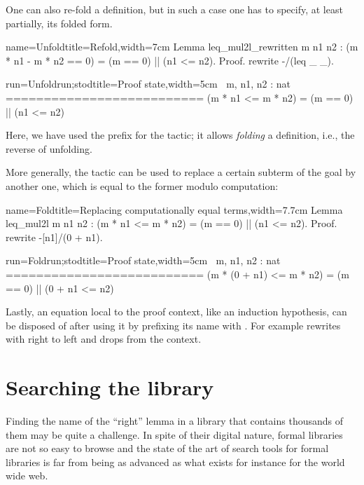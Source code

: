 One can also re-fold a definition, but in such a case one has to specify,
at least partially, its folded form.

\begin{coq-left}{name=Unfold}{title=Refold,width=7cm}
Lemma leq_mul2l_rewritten m n1 n2 :
  (m * n1 - m * n2 == 0) =
    (m == 0) || (n1 <= n2).
Proof.
rewrite -/(leq _ _).
\end{coq-left}
\begin{coqout-right}{run=Unfoldrun;stod}{title=Proof state,width=5cm}
$~$
m, n1, n2 : nat
==========================
(m * n1 <= m * n2) =
  (m == 0) || (n1 <= n2)
\end{coqout-right}
Here, we have used the \C{-/} prefix for the  tactic; it
allows \emph{folding} a definition, i.e., the reverse of unfolding.


More generally, the  tactic can be used to replace a
certain subterm of the goal by another one, which is equal to the
former modulo computation:

\begin{coq-left}{name=Fold}{title=Replacing computationally equal terms,width=7.7cm}
Lemma leq_mul2l m n1 n2 :
(m * n1 <= m * n2) = (m == 0) || (n1 <= n2).
Proof.
rewrite -[n1]/(0 + n1).
\end{coq-left}
\begin{coqout-right}{run=Foldrun;stod}{title=Proof state,width=5cm}
$~$
m, n1, n2 : nat
==========================
(m * (0 + n1) <= m * n2) =
  (m == 0) || (0 + n1 <= n2)
\end{coqout-right}

Lastly, an equation local to the proof context, like an
induction hypothesis, can be disposed of after using it by
prefixing its name with \C{\{\}}.  For example
 rewrites with  right to
left and drops  from the context.


\section{Searching the library}\label{sec:search}

Finding the name of the ``right'' lemma in a library that contains
thousands of them may be quite a challenge. In spite of their digital
nature, formal libraries are not so easy to browse and the state
of the art of search tools for formal libraries is far from being as
advanced as what exists for instance for the world wide web.

